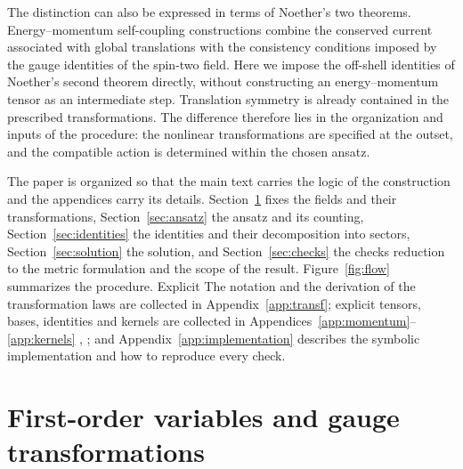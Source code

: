 \documentclass[prd,aps,preprint,superscriptaddress,nofootinbib,amsmath,amssymb,eqsecnum]{revtex4-2}
\providecommand{\DIFaddtex}[1]{{\protect\color{blue} \sf #1}} %
\providecommand{\DIFdeltex}[1]{{\protect\color{red} \scriptsize #1}} %
\providecommand{\DIFaddbegin}{} %
\providecommand{\DIFaddend}{} %
\providecommand{\DIFdelbegin}{} %
\providecommand{\DIFdelend}{} %
\providecommand{\DIFadd}[1]{\texorpdfstring{\DIFaddtex{#1}}{#1}} %
\providecommand{\DIFdel}[1]{\texorpdfstring{\DIFdeltex{#1}}{}} %
\begin{document}
The \DIFdelbegin \DIFdel{distinction can also be expressed in terms of Noether's two theorems. Energy--momentum
self-coupling constructions combine the conserved current associated with global translations
with the consistency conditions imposed by the gauge identities of the spin-two field. Here
we impose the off-shell identities of Noether's second theorem directly, without constructing
an energy--momentum tensor as an intermediate step. Translation symmetry is already contained
in the prescribed transformations. The difference therefore lies in the organization and
inputs of the procedure: the nonlinear transformations are specified at the outset,
and the compatible action is determined within the chosen ansatz.
}%

\DIFdel{The }\DIFdelend paper is organized so that the main text carries the logic of the construction and the
appendices carry its details. Section~\ref{sec:variables} fixes the fields and their
transformations, Section~\ref{sec:ansatz} the ansatz and its counting, Section~\ref{sec:identities}
the identities and their decomposition into sectors, Section~\ref{sec:solution} the solution,
and Section~\ref{sec:checks} the \DIFdelbegin \DIFdel{checks }\DIFdelend \DIFaddbegin \DIFadd{reduction to the metric formulation }\DIFaddend and the scope of the
result. Figure~\ref{fig:flow} summarizes the procedure. \DIFdelbegin \DIFdel{Explicit }\DIFdelend \DIFaddbegin \DIFadd{The notation and the derivation of the
transformation laws are collected in Appendix~\ref{app:transf}; explicit }\DIFaddend tensors, bases,
identities and kernels \DIFdelbegin \DIFdel{are collected }\DIFdelend in Appendices~\ref{app:momentum}--\ref{app:kernels}\DIFdelbegin \DIFdel{, }\DIFdelend \DIFaddbegin \DIFadd{; }\DIFaddend and
Appendix~\ref{app:implementation} describes the symbolic implementation and how to reproduce
every check.

\section{First-order variables and gauge transformations}
\label{sec:variables}
\end{document}
